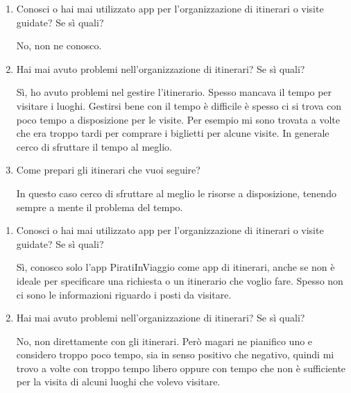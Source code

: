 

\begin{enumerate}

\item Conosci o hai mai utilizzato app per l'organizzazione di itinerari o visite guidate? Se sì quali?

No, non ne conosco.

\item Hai mai avuto problemi nell'organizzazione di itinerari? Se sì quali?

Sì, ho avuto problemi nel gestire l'itinerario. Spesso mancava il tempo per visitare i luoghi. Gestirsi bene con il tempo è difficile è spesso ci si trova con poco tempo a disposizione per le visite. Per esempio mi sono trovata a volte che era troppo tardi per comprare i biglietti per alcune visite. In generale cerco di sfruttare il tempo al meglio.

\item Come prepari gli itinerari che vuoi seguire?

In questo caso cerco di sfruttare al meglio le risorse a disposizione, tenendo sempre a mente il problema del tempo.

\end{enumerate}

\clearpage
{}

\begin{enumerate}

\item Conosci o hai mai utilizzato app per l'organizzazione di itinerari o visite guidate? Se sì quali?

Sì, conosco solo l'app PiratiInViaggio come app di itinerari, anche se non è ideale per specificare una richiesta o un itinerario che voglio fare. Spesso non ci sono le informazioni riguardo i posti da visitare. 

\item Hai mai avuto problemi nell'organizzazione di itinerari? Se sì quali?

No, non direttamente con gli itinerari. Però magari ne pianifico uno e considero troppo poco tempo, sia in senso positivo che negativo, quindi mi trovo a volte con troppo tempo libero oppure con tempo che non è sufficiente per la visita di alcuni luoghi che volevo visitare.

\end{enumerate}

